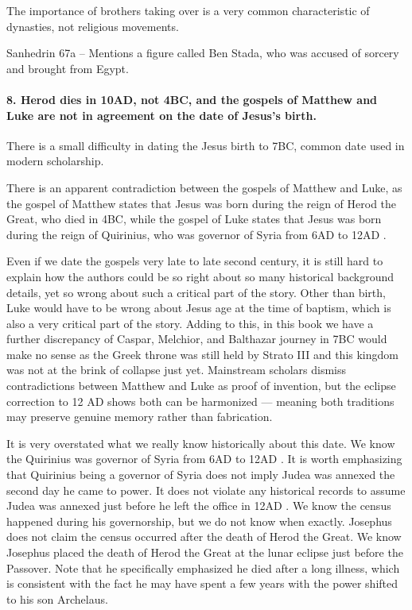 The importance of brothers taking over is a very common characteristic of dynasties, not religious movements.

Sanhedrin 67a -- Mentions a figure called Ben Stada, who was accused of sorcery and brought from Egypt.


\paragraph{8.
Herod dies in 10AD, not 4BC, and the gospels of Matthew and Luke are not in agreement on the date of Jesus's birth.}\label{par:herod-dies-in-10ad-not-4bc-and-the-gospels-of-matthew-and-luke-are-not-in-agreement-on-the-date-of-jesuss-birth.}

There is a small difficulty in dating the Jesus birth to 7BC, common date used in modern scholarship.

There is an apparent contradiction between the gospels of Matthew and Luke, as the gospel of Matthew states that Jesus was born during the reign of Herod the Great, who died in 4BC, while the gospel of Luke states that Jesus was born during the reign of Quirinius, who was governor of Syria from 6AD to 12AD .

Even if we date the gospels very late to late second century, it is still hard to explain how the authors could be so right about so many historical background details, yet so wrong about such a critical part of the story.
Other than birth, Luke would have to be wrong about Jesus age at the time of baptism, which is also a very critical part of the story.
Adding to this, in this book we have a further discrepancy of Caspar, Melchior, and Balthazar journey in 7BC would make no sense as the Greek throne was still held by Strato III and this kingdom was not at the brink of collapse just yet.
Mainstream scholars dismiss contradictions between Matthew and Luke as proof of invention, but the eclipse correction to 12 AD shows both can be harmonized — meaning both traditions may preserve genuine memory rather than fabrication.

It is very overstated what we really know historically about this date.
We know the Quirinius was governor of Syria from 6AD to 12AD .
It is worth emphasizing that Quirinius being a governor of Syria does not imply Judea was annexed the second day he came to power.
It does not violate any historical records to assume Judea was annexed just before he left the office in 12AD .
We know the census happened during his governorship, but we do not know when exactly.
Josephus does not claim the census occurred after the death of Herod the Great.
We know Josephus placed the death of Herod the Great at the lunar eclipse just before the Passover.
Note that he specifically emphasized he died after a long illness, which is consistent with the fact he may have spent a few years with the power shifted to his son Archelaus.

